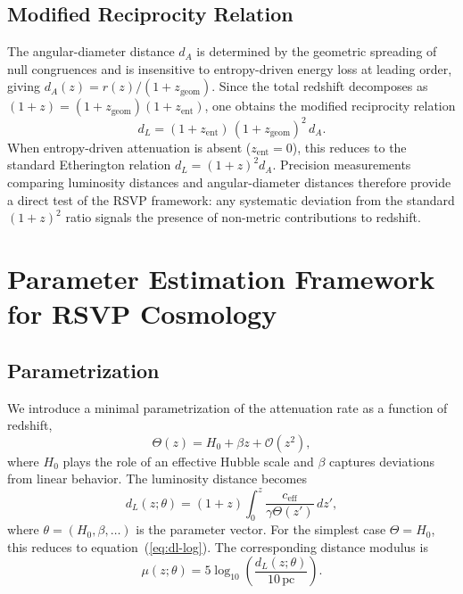 \documentclass[12pt,a4paper]{article}
\theoremstyle{plain}
\theoremstyle{definition}
\theoremstyle{remark}
\begin{document}
\subsection{Modified Reciprocity Relation}

The angular-diameter distance $d_A$ is determined by the geometric
spreading of null congruences and is insensitive to entropy-driven
energy loss at leading order, giving $d_A(z) = r(z)/(1+z_{\mathrm{geom}})$.
Since the total redshift decomposes as $(1+z) = (1+z_{\mathrm{geom}})
(1+z_{\mathrm{ent}})$, one obtains the modified reciprocity relation
\begin{equation}
d_L = (1+z_{\mathrm{ent}})\,(1+z_{\mathrm{geom}})^2\,d_A.
\end{equation}
When entropy-driven attenuation is absent ($z_{\mathrm{ent}}=0$), this
reduces to the standard Etherington relation $d_L = (1+z)^2 d_A$.
Precision measurements comparing luminosity distances and
angular-diameter distances therefore provide a direct test of the RSVP
framework: any systematic deviation from the standard $(1+z)^2$ ratio
signals the presence of non-metric contributions to redshift.

\section{Parameter Estimation Framework for RSVP Cosmology}
\label{sec:paramest}

\subsection{Parametrization}

We introduce a minimal parametrization of the attenuation rate as a
function of redshift,
\begin{equation}
\Theta(z) = H_0 + \beta z + \mathcal{O}(z^2),
\end{equation}
where $H_0$ plays the role of an effective Hubble scale and $\beta$
captures deviations from linear behavior. The luminosity distance
becomes
\begin{equation}
d_L(z;\theta) =
(1+z)\int_0^z \frac{c_{\mathrm{eff}}}{\gamma\Theta(z')}\,dz',
\end{equation}
where $\theta = (H_0,\beta,\ldots)$ is the parameter vector. For the
simplest case $\Theta = H_0$, this reduces to
equation~(\ref{eq:dl-log}). The corresponding distance modulus is
\begin{equation}
\mu(z;\theta) = 5\log_{10}\!\left(\frac{d_L(z;\theta)}{10\,\mathrm{pc}}\right).
\end{equation}
\end{document}
